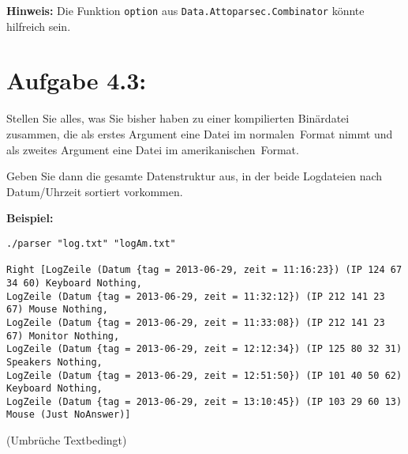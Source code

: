 \documentclass[a4paper,10pt]{scrartcl}
\newcommand{\theuebungszettel}{4}
\begin{document}
\textbf{Hinweis:} Die Funktion \texttt{option} aus \texttt{Data.Attoparsec.Combinator} könnte hilfreich sein.

\section*{Aufgabe \theuebungszettel.3:}

Stellen Sie alles, was Sie bisher haben zu einer kompilierten Binärdatei zusammen, die als erstes Argument eine Datei im \glqq normalen\grqq \ Format nimmt und als zweites Argument eine Datei im \glqq amerikanischen\grqq \ Format.

Geben Sie dann die gesamte Datenstruktur aus, in der beide Logdateien nach Datum/Uhrzeit sortiert vorkommen.\\\smallskip

\textbf{Beispiel:}\footnotesize
\begin{verbatim}
./parser "log.txt" "logAm.txt"

Right [LogZeile (Datum {tag = 2013-06-29, zeit = 11:16:23}) (IP 124 67 34 60) Keyboard Nothing,
LogZeile (Datum {tag = 2013-06-29, zeit = 11:32:12}) (IP 212 141 23 67) Mouse Nothing,
LogZeile (Datum {tag = 2013-06-29, zeit = 11:33:08}) (IP 212 141 23 67) Monitor Nothing,
LogZeile (Datum {tag = 2013-06-29, zeit = 12:12:34}) (IP 125 80 32 31) Speakers Nothing,
LogZeile (Datum {tag = 2013-06-29, zeit = 12:51:50}) (IP 101 40 50 62) Keyboard Nothing,
LogZeile (Datum {tag = 2013-06-29, zeit = 13:10:45}) (IP 103 29 60 13) Mouse (Just NoAnswer)]
\end{verbatim}
\normalsize
(Umbrüche Textbedingt)
\end{document}
